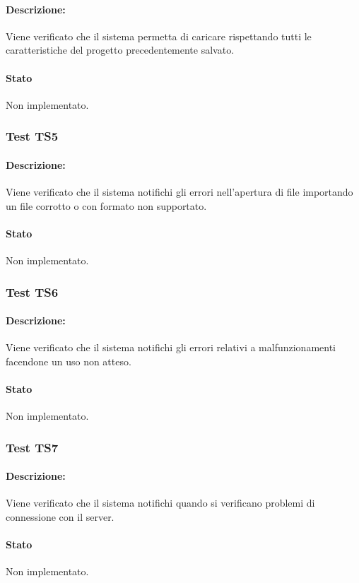 \documentclass[../PianoDiQualifica.tex]{subfiles}
\begin{document}
	\paragraph{Descrizione:} Viene verificato che il sistema permetta di caricare rispettando tutti le caratteristiche del progetto precedentemente salvato.
	\paragraph{Stato} Non implementato.
	
	\subsubsection{Test TS5} 
	\paragraph{Descrizione:} Viene verificato che il sistema notifichi
	gli errori nell'apertura di file importando un file corrotto o con
	formato non supportato.
	\paragraph{Stato} Non implementato.
	
	\subsubsection{Test TS6} 
	\paragraph{Descrizione:} Viene verificato che il sistema notifichi gli errori relativi a malfunzionamenti	facendone un uso non atteso.
	\paragraph{Stato} Non implementato.
	
	\subsubsection{Test TS7} 
	\paragraph{Descrizione:} Viene verificato che il sistema notifichi quando si verificano problemi di connessione con il server.
	\paragraph{Stato} Non implementato.
	
\end{document}
